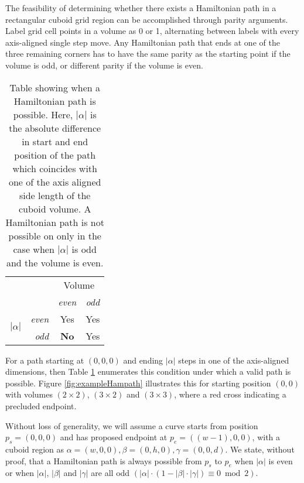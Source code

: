 The feasibility of determining whether there exists a Hamiltonian path in a rectangular cuboid
grid region can be accomplished through parity arguments.
Label grid cell points in a volume as 0 or 1,
alternating between labels with every axis-aligned single step move.
Any Hamiltonian path that ends at one of the three remaining corners has to have the same parity as the starting point if the
volume is odd, or different parity if the volume is even.

\begin{table}[h]
  \centering
  \begin{tabular}[t]{cr|cc}
    \multicolumn{2}{c}{ \multirow{2}{*}{Path Possible} } & \multicolumn{2}{c}{Volume} \\
    & & \textit{even} & \textit{odd} \\
    \hline
      \multirow{2}{*}{ $|\alpha|$ } & \textit{even} & Yes & Yes \\
       & \textit{odd} & \textbf{No} & Yes \\
     \hline
  \end{tabular}
  \caption{ Table showing when a Hamiltonian path is possible. Here, $|\alpha|$ is the absolute difference in start and end position of the path which
            coincides with one of the axis aligned side length of the cuboid volume. A Hamiltonian path is not possible on only in the case
            when $|\alpha|$ is odd and the volume is even. }
  \label{table:pathTable}
\end{table}


For a path starting at $(0,0,0)$ and ending $|\alpha|$ steps in one of the axis-aligned dimensions,
then Table \ref{table:pathTable} enumerates this condition under which a valid path is possible.
Figure \ref{fig:exampleHampath} illustrates this for starting position $(0,0)$ with volumes $(2 \times 2)$, $(3 \times 2)$ and $(3 \times 3)$,
where a red cross indicating a precluded endpoint.

Without loss of generality, we will assume a curve starts from position $p_s=(0,0,0)$ and has proposed
endpoint at $p_e=((w-1),0,0)$, with a cuboid region as $\alpha = (w,0,0), \beta = (0,h,0), \gamma = (0,0,d)$.
We state, without proof, that
a Hamiltonian path is always possible from $p_s$ to $p_e$ when $|\alpha|$ is even or when $|\alpha|$, $|\beta|$ and $|\gamma|$
are all odd  $(|\alpha| \cdot (1 - |\beta| \cdot |\gamma|) \equiv 0 \bmod 2)$.

